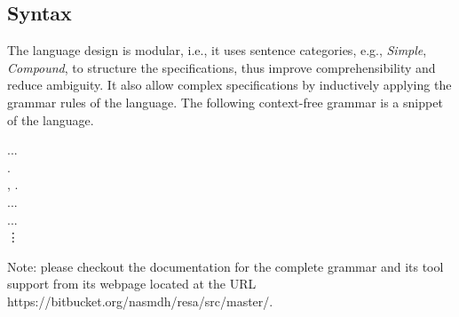 \subsection*{Syntax}
The language design is modular, i.e., it uses sentence categories, e.g., \textit{Simple}, \textit{Compound}, to structure the specifications, thus improve comprehensibility and reduce ambiguity. It also allow complex specifications by inductively applying the grammar rules of the language. The following context-free grammar is a snippet of the \resa{} language. 
\begin{bnf*}
	{ \bnfor {}\bnfor{} ...}\\
	{ .} \\%
	{, .} \\%
	{\bnfor ...} \\%
	{  \bnfor...} \\%
	\vdots
\end{bnf*}
{\footnotesize Note: please checkout the \resa{} documentation for the complete grammar and its tool support from its webpage located at the URL {https://bitbucket.org/nasmdh/resa/src/master/}. }
